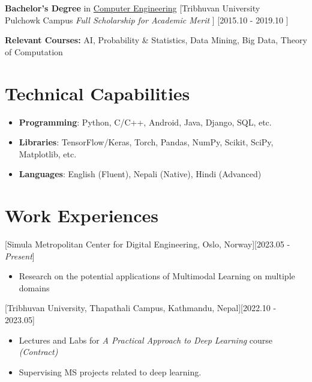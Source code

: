 \documentclass{resume}
\begin{document}
\ResumeItem
{\textbf{ Bachelor's Degree}  in \href{ http://doece.pcampus.edu.np/index.php/bachelor-in-computer-engineering
}{Computer Engineering}}
[Tribhuvan University\\
Pulchowk Campus \qquad  \textit{Full Scholarship for Academic Merit}
]
[2015.10 - 2019.10 ]

\textbf{Relevant Courses:} AI, Probability \& Statistics, Data Mining, Big Data, Theory of Computation 



\section[Technical Capabilities]{Technical Capabilities\protect}
\begin{itemize}
   \item \textbf{Programming}: Python, C/C++, Android, Java, Django, SQL, etc.
   \item \textbf{Libraries}: TensorFlow/Keras, Torch, Pandas, NumPy, Scikit, SciPy, Matplotlib, etc.
   \item \textbf{Languages}:
   English (Fluent), Nepali (Native), Hindi (Advanced)
\end{itemize}

\section{Work Experiences}
[Simula Metropolitan Center for Digital Engineering, Oslo, Norway][2023.05 - \textit{Present}]
\begin{itemize}
   \item Research on the potential applications of Multimodal Learning on multiple domains  
\end{itemize}

[Tribhuvan University, Thapathali Campus, Kathmandu, Nepal][2022.10 - 2023.05]
\begin{itemize}
   \item Lectures and Labs for \textit{A Practical Approach to Deep Learning} course \textit{(Contract)}
   \item Supervising MS projects related to deep learning.
\end{itemize}
\end{document}
